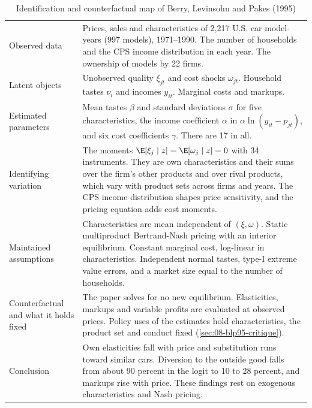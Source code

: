 \begin{table}[htbp]
\centering
\caption{Identification and counterfactual map of Berry, Levinsohn and Pakes (1995)}
\label{tab:08-blp95-map}
\footnotesize
\renewcommand{\arraystretch}{1.1}
\begin{tabularx}{\textwidth}{@{}>{\raggedright\arraybackslash}p{2.6cm}>{\raggedright\arraybackslash}X@{}}
\toprule
Observed data & Prices, sales and characteristics of 2,217 U.S. car model-years (997 models), 1971--1990.
  The number of households and the CPS income distribution in each year. The ownership of models by 22
  firms. \\
\addlinespace
Latent objects & Unobserved quality $\xi_{jt}$ and cost shocks $\omega_{jt}$. Household tastes $\nu_i$ and
  incomes $y_{it}$. Marginal costs and markups. \\
\addlinespace
Estimated parameters & Mean tastes $\beta$ and standard deviations $\sigma$ for five characteristics, the
  income coefficient $\alpha$ in $\alpha\ln(y_{it}-p_{jt})$, and six cost coefficients $\gamma$. There are
  17 in all. \\
\addlinespace
Identifying variation & The moments $\E[\xi_j\mid z]=\E[\omega_j\mid z]=0$ with 34 instruments. They are
  own characteristics and their sums over the firm's other products and over rival products, which vary with
  product sets across firms and years. The CPS income distribution shapes price sensitivity, and the
  pricing equation adds cost moments. \\
\addlinespace
Maintained assumptions & Characteristics are mean independent of $(\xi,\omega)$. Static multiproduct
  Bertrand-Nash pricing with an interior equilibrium. Constant marginal cost, log-linear in characteristics.
  Independent normal tastes, type-I extreme value errors, and a market size equal to the number of
  households. \\
\addlinespace
Counterfactual and what it holds fixed & The paper solves for no new equilibrium. Elasticities, markups and
  variable profits are evaluated at observed prices. Policy uses of the estimates hold characteristics, the
  product set and conduct fixed (\cref{sec:08-blp95-critique}). \\
\addlinespace
Conclusion & Own elasticities fall with price and substitution runs toward similar cars. Diversion to the
  outside good falls from about 90 percent in the logit to 10 to 28 percent, and markups rise with price.
  These findings rest on exogenous characteristics and Nash pricing. \\

\end{tabularx}
\end{table}
